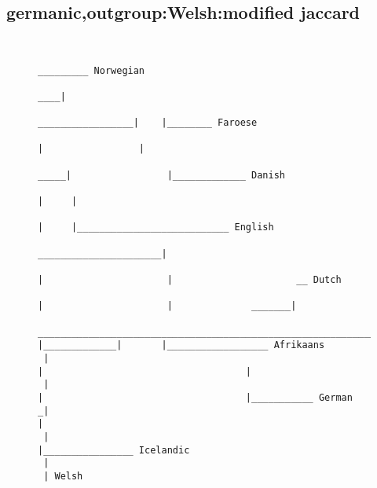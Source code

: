 \subsection{germanic,outgroup:Welsh:modified jaccard}
\begin{figure}[H]
\begin{center}
{
\selectfont
\begin{verbatim}

                                                                                                                                        _________ Norwegian
                                                                                                                                   ____|
                                                                                                                 _________________|    |________ Faroese
                                                                                                                |                 |
                                                                                                           _____|                 |_____________ Danish
                                                                                                          |     |
                                                                                                          |     |___________________________ English
                                                                                    ______________________|
                                                                                   |                      |                      __ Dutch
                                                                                   |                      |              _______|
  _________________________________________________________________________________|                      |_____________|       |__________________ Afrikaans
 |                                                                                 |                                    |
 |                                                                                 |                                    |___________ German
_|                                                                                 |
 |                                                                                 |________________ Icelandic
 |
 | Welsh



\end{verbatim}
}
\label{...}
\end{center}
\end{figure}
